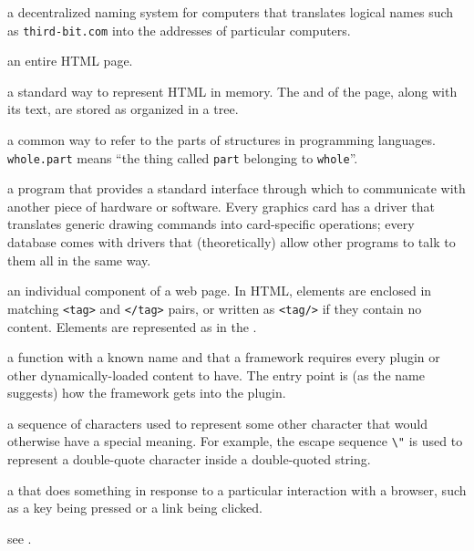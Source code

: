 \begin{description}
a decentralized naming system for computers that translates logical names such
as \texttt{third-bit.com} into the addresses of particular computers.

an entire HTML page.

a standard way to represent HTML in memory. The  and
 of the page, along with its text, are stored as
 organized in a tree.

a common way to refer to the parts of structures in programming languages.
\texttt{whole.part} means ``the thing called \texttt{part} belonging to \texttt{whole}''.

a program that provides a standard interface through which to communicate with
another piece of hardware or software. Every graphics card has a driver that
translates generic drawing commands into card-specific operations; every
database comes with drivers that (theoretically) allow other programs to talk
to them all in the same way.

an individual component of a web page. In HTML, elements are enclosed in
matching \texttt{{\textless}tag{\textgreater}{}} and \texttt{{\textless}/tag{\textgreater}{}} pairs, or written as \texttt{{\textless}tag/{\textgreater}{}} if they contain no
content. Elements are represented as  in the .

a function with a known name and  that a framework
requires every plugin or other dynamically-loaded content to have. The entry
point is (as the name suggests) how the framework gets into the plugin.

a sequence of characters used to represent some other character that would
otherwise have a special meaning. For example, the escape sequence \texttt{\textbackslash{}"} is
used to represent a double-quote character inside a double-quoted string.

a  that does something in response to
a particular interaction with a browser, such as a key being pressed or a link
being clicked.

see .


\end{description}

